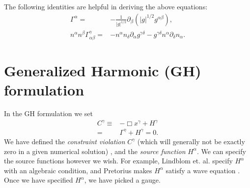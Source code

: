 \documentclass[%
notitlepage,
report,
nofootinbib,
 amsmath,amssymb,
 aps,
]{revtex4-1}
\begin{document}
   The following identities are helpful in deriving the above equations:
\begin{subequations}
\begin{align}
   \Gamma^{\alpha}
   =&
-  \frac{1}{|g|^{1/2}}\partial_{\beta}
   \left(
      |g|^{1/2}g^{\alpha\beta}
   \right)
   ,\\
   n^{\alpha}n^{\beta}\Gamma^{\gamma}_{\alpha\beta}
   =&
-  n^{\alpha}n_{\delta}\partial_{\alpha}g^{\gamma\delta}
-  g^{\gamma\delta}n^{\alpha}\partial_{\delta}n_{\alpha}
   .
\end{align}
\end{subequations}
\section{Generalized Harmonic (GH) formulation}
In the GH formulation we set
\begin{align}
\label{eq:gh_condition}
   C^{\gamma}
   \equiv&
   -\Box x^{\gamma}
+  H^{\gamma}
   \nonumber\\
   =& 
   \Gamma^{\gamma}
+  H^{\gamma} = 0
   .
\end{align} 
We have defined the \emph{constraint violation}
$C^{\gamma}$ (which will generally not be exactly zero in a given numerical solution)
, and the \emph{source function} $H^{\alpha}$.
We can specify the source functions however we wish.
For example, Lindblom et. al. \cite{Lindblom:2005qh} specify
$H^{\alpha}$ with an algebraic condition,
and Pretorius makes $H^{\alpha}$
satisfy a wave equation \cite{Pretorius:2004jg}.
Once we have specified $H^{\alpha}$, we have picked a gauge.
\end{document}

